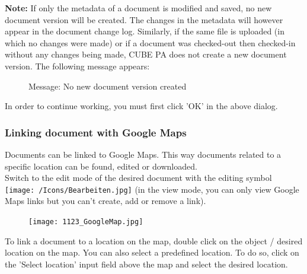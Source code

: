 \textbf{Note:} If only the metadata of a document is modified and saved, no new document version will be created. The changes in the metadata will however appear in the document change log. Similarly, if the same file is uploaded (in which no changes were made) or if a document was checked-out then checked-in without any changes being made, CUBE PA does not create a new document version. The following message appears:

\begin{figure}[H]
\caption{Message: No new document version created}
\end{figure}

In order to continue working, you must first click 'OK' in the above dialog.

\subsubsection{Linking document with Google Maps}
\label{bkm:Ref442545553}
Documents can be linked to Google Maps. This way documents related to a specific location can be found, edited or downloaded. \\
Switch to the edit mode of the desired document with the editing symbol \texttt{[image: /Icons/Bearbeiten.jpg]} (in the view mode, you can only view Google Maps links but you can't create, add or remove a link).

\vspace{2mm}

\begin{figure}
\vspace{-15pt}
\texttt{[image: 1123\_GoogleMap.jpg]}
\end{figure}

To link a document to a location on the map, double click on the object / desired location on the map. You can also select a predefined location. To do so, click on the 'Select location' input field above the map and select the desired location.

